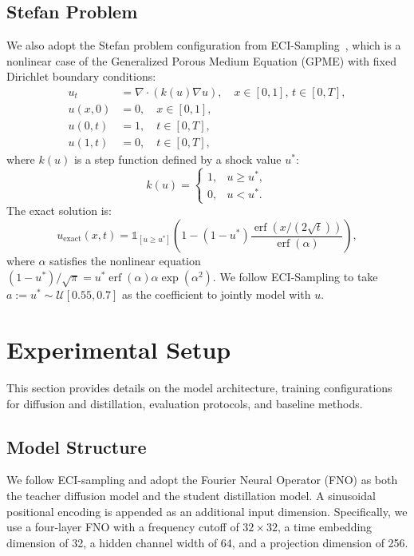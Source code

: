 \documentclass{article}
\theoremstyle{plain}
\theoremstyle{definition}
\theoremstyle{remark}
\begin{document}
\subsection{Stefan Problem}
We also adopt the Stefan problem configuration from ECI-Sampling~\cite{cheng2025eci}, which is a nonlinear case of the Generalized Porous Medium Equation (GPME) with fixed Dirichlet boundary conditions:
\begin{align*}
u_t &= \nabla \cdot (k(u)\nabla u), \quad x \in [0,1], \, t \in [0,T], \\
u(x,0) &= 0, \quad x \in [0,1], \\
u(0,t) &= 1, \quad t \in [0,T], \\
u(1,t) &= 0, \quad t \in [0,T],
\end{align*}
where $k(u)$ is a step function defined by a shock value $u^*$:
\begin{equation*}
k(u) =
\begin{cases}
1, & u \geq u^*, \\
0, & u < u^*.
\end{cases}
\end{equation*}
The exact solution is:
\begin{equation*}
u_{\text{exact}}(x,t) = \mathbb{1}_{[u \geq u^*]} \left(1 - (1 - u^*) \frac{\operatorname{erf}(x/(2\sqrt{t}))}{\operatorname{erf}(\alpha)}\right),
\end{equation*}
where $\alpha$ satisfies the nonlinear equation $(1 - u^*)/\sqrt{\pi} = u^* \operatorname{erf}(\alpha)\alpha\exp(\alpha^2)$. We follow ECI-Sampling to take $a:=u^* \sim \mathcal{U}[0.55, 0.7]$ as the coefficient to jointly model with $u$.

\section{Experimental Setup}\label{appendix:setup}

This section provides details on the model architecture, training configurations for diffusion and distillation, evaluation protocols, and baseline methods.

\subsection{Model Structure}

We follow ECI-sampling \cite{cheng2025eci} and adopt the Fourier Neural Operator (FNO) \cite{li2020fno} as both the teacher diffusion model and the student distillation model. A sinusoidal positional encoding \cite{vaswani2017attention} is appended as an additional input dimension. Specifically, we use a four-layer FNO with a frequency cutoff of $32 \times 32$, a time embedding dimension of 32, a hidden channel width of 64, and a projection dimension of 256.
\end{document}
